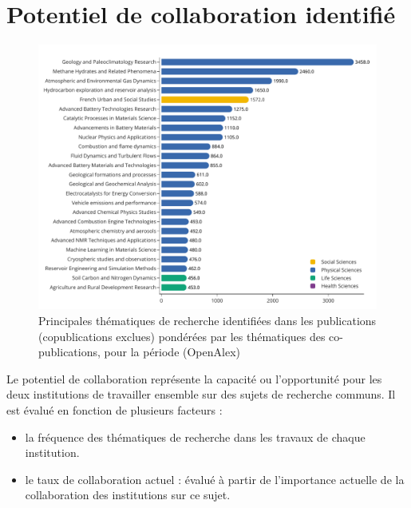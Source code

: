 \documentclass[french, 11pt]{dibiso/pubpart}
\begin{document}
{\footnotesize\topicscollaborationsinfo}








\pagebreak

\section{Potentiel de collaboration identifié}

\begin{figure}[!h]
  \includegraphics[width=\textwidth]{figures/topics_potential_collaborations.pdf}
  \centering
  \caption{Principales thématiques de recherche identifiées dans les publications {\entitiesacronym} (copublications exclues) pondérées par les thématiques des co-publications, pour la période {\reportyear} (OpenAlex)}
  \label{fig_topics_potential_collaborations}
\end{figure}

{\footnotesize\topicspotentialcollaborationsinfo}

Le potentiel de collaboration représente la capacité ou l'opportunité pour les deux institutions de travailler ensemble sur des sujets de recherche communs. Il est évalué en fonction de plusieurs facteurs :

\begin{itemize}
    \item la fréquence des thématiques de recherche dans les travaux de chaque institution.
    \item le taux de collaboration actuel : évalué à partir de l'importance actuelle de la collaboration des institutions sur ce sujet.
\end{itemize}
\end{document}
